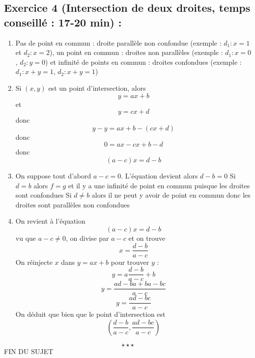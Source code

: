 \subsection*{Exercice 4 (Intersection de deux droites, temps conseillé : 17-20 min) : }
\begin{enumerate}
\item Pas de point en commun : droite parallèle non confondue (exemple : $d_1:x=1$ et $d_2:x=2$), un point en commun : droites non parallèles (exemple : $d_1:x=0$, $d_2:y=0$) et infinité de points en commun : droites confondues (exemple :$d_1:x+y=1$, $d_2:x+y=1$)
\item Si $(x,y)$ est un point d'intersection, alors 
$$y = ax+b$$ et $$y = cx+d$$ donc $$y-y = ax+b - (cx+d)$$ donc $$0 = ax - cx + b-d$$ donc 
$$\boxed{(a-c) x = d-b}$$
\item On suppose tout d'abord $a-c = 0$. L'équation devient alors $d-b = 0$ \newline
Si $d =b $ alors $f=g$ et il y a une infinité de point en commun puisque les droites sont confondues\newline
Si $d \neq b$ alors il ne peut y avoir de point en commun donc les droites sont parallèles non confondues
\item On revient à l'équation $$(a-c) x = d-b$$ vu que $a-c\neq 0$, on divise par $a-c$ et on trouve $$\boxed{x = \frac{d-b}{a-c}}$$ On réinjecte $x$ dans $y=ax+b$ pour trouver $y$ : $$y = a\frac{d-b}{a-c} +b$$ $$ y=\frac{ad-ba +ba -bc}{a-c}$$ $$\boxed{y=\frac{ad-bc}{a-c}}$$ On déduit que bien que le point d'intersection est  $$\left(\frac{d-b}{a-c} ,\frac{ad-bc}{a-c}\right)$$
\end{enumerate}
$$\star \star \star$$
\center
FIN DU SUJET

